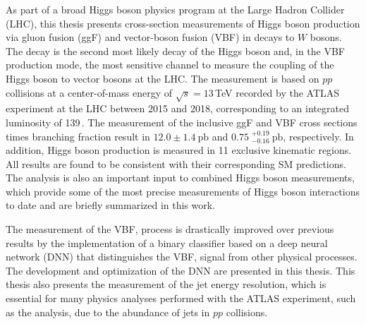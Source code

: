 
As part of a broad Higgs boson physics program at the Large Hadron Collider (LHC), this thesis presents cross-section measurements of Higgs boson production via gluon fusion (ggF) and vector-boson fusion (VBF) in decays to $W$ bosons.
The \HWW decay is the second most likely decay of the Higgs boson and, in the VBF production mode, the most sensitive channel to measure the coupling of the Higgs boson to vector bosons at the LHC.
The measurement is based on $pp$ collisions at a center-of-mass energy of $\sqrt{s} = 13\,$TeV recorded by the ATLAS experiment at the LHC between 2015 and 2018, corresponding to an integrated luminosity of 139\,\ifb.
The measurement of the inclusive ggF and VBF cross sections times branching fraction result in $12.0 \pm 1.4~\mathrm{pb}$ and $0.75\;^{+0.19}_{-0.16}~\mathrm{pb}$, respectively.
In addition, Higgs boson production is measured in 11 exclusive kinematic regions. All results are found to be consistent with their corresponding SM predictions.
The analysis is also an important input to combined Higgs boson measurements, which provide some of the most precise measurements of Higgs boson interactions to date and are briefly summarized in this work.

The measurement of the VBF, \HWW process is drastically improved over previous results by the implementation of a binary classifier based on a deep neural network (DNN) that distinguishes the VBF, \HWW signal from other physical processes. 
The development and optimization of the DNN are presented in this thesis. 
This thesis also presents the measurement of the jet energy resolution, which is essential for many physics analyses performed with the ATLAS experiment, such as the \HWW analysis, due to the abundance of jets in $pp$ collisions.

